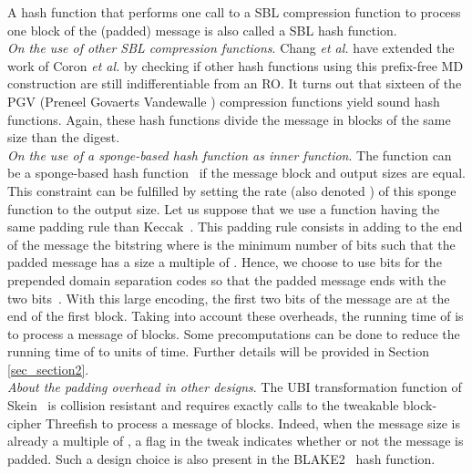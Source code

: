 \documentclass{llncs}
\renewcommand{\paragraph}[1]{\noindent\textit{#1}.}
\begin{document}
A hash function that performs one call to a SBL compression function to process one block of the (padded) message is also called a SBL hash function.~\\



\paragraph{On the use of other SBL compression functions}
Chang \emph{et al.} \cite{CLNY06} have extended the work of Coron \emph{et al.} by checking if other 
hash functions using this prefix-free MD construction are still indifferentiable from an RO.
It turns out that sixteen of the PGV (Preneel Govaerts Vandewalle \cite{PGV93}) compression functions yield sound hash functions.
Again, these hash functions divide the message in blocks of the same size than the digest.~\\

\paragraph{On the use of a sponge-based hash function as inner function}
The function  can be a sponge-based hash function~\cite{BerDaePeeVan08} if the message block and output sizes are equal.
This constraint can be fulfilled by setting the rate (also denoted ) of this sponge function to the output size. Let us suppose that we use
a function having the same padding rule than Keccak~\cite{BerDaePeeVan13}. This padding rule consists in adding to the end of the message 
the bitstring  where  is
the minimum number of bits  such that the padded message has a size a multiple of . 
Hence, we choose to use  bits for the prepended domain separation codes so that the padded message ends with the two bits~.
With this large encoding, the first two bits of the message are at the end of the first block. Taking into account these overheads, the running time of
 is  to process a message of  blocks.
Some precomputations can be done to reduce the running time of  to  units of time. 
Further details will be provided in Section \ref{sec_section2}.~\\

\paragraph{About the padding overhead in other designs} The UBI transformation function of Skein~\cite{FLSWBKCW09} is collision resistant and 
requires exactly  calls to the tweakable
block-cipher Threefish to process a message of  blocks. Indeed, when the message size is already a multiple of , a flag in the tweak indicates whether
or not the message is padded. Such a design choice is also present in the BLAKE2~\cite{ANWW13} hash function.
\end{document}
